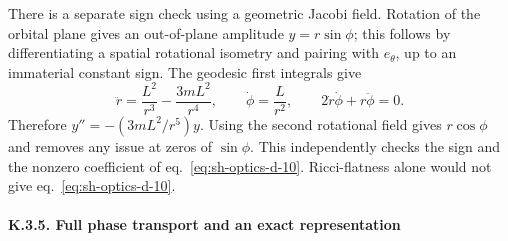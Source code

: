 \documentclass[
  english,
  11pt,
  reqno]{amsart}
\begin{document}
There is a separate sign check using a geometric Jacobi field. Rotation
of the orbital plane gives an out-of-plane amplitude \(y=r\sin\phi\);
this follows by differentiating a spatial rotational isometry and
pairing with \(e_\theta\), up to an immaterial constant sign. The
geodesic first integrals give \[
 \ddot r=\frac{L^2}{r^3}-\frac{3mL^2}{r^4},\qquad
 \dot\phi=\frac L{r^2},\qquad
 2\dot r\dot\phi+r\ddot\phi=0.
\] Therefore \(y''=-(3mL^2/r^5)y\). Using the second rotational field
gives \(r\cos\phi\) and removes any issue at zeros of \(\sin\phi\). This
independently checks the sign and the nonzero coefficient of
eq.~\ref{eq:sh-optics-d-10}. Ricci-flatness alone would not give
eq.~\ref{eq:sh-optics-d-10}.

\protect{}\label{sec:sh-optics-5}

\paragraph{K.3.5. Full phase transport and an exact
representation}\label{k.3.5.-full-phase-transport-and-an-exact-representation}
\end{document}
